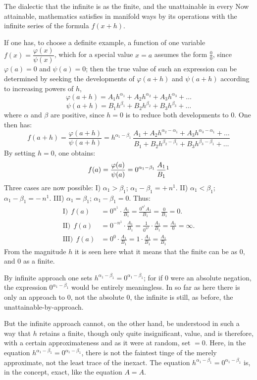 \documentclass[12pt]{book}
\begin{document}
The dialectic that the infinite is as the finite, and the unattainable in every Now
attainable, mathematics satisfies in manifold ways by its operations with the
infinite series of the formula $f(x+h)$.

If one has, to choose a definite example, a function of one variable
$f(x) = \dfrac{\varphi(x)}{\psi(x)}$, which for a special value $x = a$ assumes the
form $\frac{0}{0}$, since $\varphi(a) = 0$ and $\psi(a) = 0$; then the true value of
such an expression can be determined by seeking the developments of $\varphi(a+h)$
and $\psi(a+h)$ according to increasing powers of $h$,
\[
\varphi(a+h) = A_1 h^{\alpha_1} + A_2 h^{\alpha_2} + A_3 h^{\alpha_3} + \dots
\]
\[
\psi(a+h) = B_1 h^{\beta_1} + B_2 h^{\beta_2} + B_3 h^{\beta_3} + \dots
\]
where $\alpha$ and $\beta$ are positive, since $h = 0$ is to reduce both
developments to $0$. One then has:
\[
f(a+h) = \frac{\varphi(a+h)}{\psi(a+h)} = h^{\alpha_1-\beta_1}\,
\frac{A_1 + A_2 h^{\alpha_2-\alpha_1} + A_3 h^{\alpha_3-\alpha_1} + \dots}
     {B_1 + B_2 h^{\beta_2-\beta_1} + B_3 h^{\beta_3-\beta_1} + \dots}
\]
By setting $h = 0$, one obtains:
\[
f(a) = \frac{\varphi(a)}{\psi(a)} = 0^{\alpha_1-\beta_1}\,\frac{A_1}{B_1}\footnotemark
\]
Three cases are now possible: I) $\alpha_1 > \beta_1$; $\alpha_1 - \beta_1 = +\,n^{1}$.
II) $\alpha_1 < \beta_1$; $\alpha_1 - \beta_1 = -\,n^{1}$. III) $\alpha_1 = \beta_1$;
$\alpha_1 - \beta_1 = 0$. Thus:
\begin{align*}
\text{I)}\ \ f(a) &= 0^{n^{1}}\cdot\frac{A_1}{B_1} = \frac{0^{n^{1}}A_1}{B_1}
   = \frac{0}{B_1} = 0.\\
\text{II)}\ \ f(a) &= 0^{-n^{1}}\cdot\frac{A_1}{B_1}
   = \frac{1}{0^{n^{1}}}\cdot\frac{A_1}{B_1} = \frac{A_1}{0} = \infty.\\
\text{III)}\ \ f(a) &= 0^{0}\cdot\frac{A_1}{B_1} = 1\cdot\frac{A_1}{B_1}
   = \frac{A_1}{B_1}
\end{align*}
From the magnitude $h$ it is seen here what it means that the finite can be as $0$,
and $0$ as a finite.

By infinite approach one sets $h^{\alpha_1-\beta_1} = 0^{\alpha_1-\beta_1}$; for if
$0$ were an absolute negation, the expression $0^{\alpha_1-\beta_1}$ would be
entirely meaningless. In so far as here there is only an approach to $0$, not the
absolute $0$, the infinite is still, as before, the unattainable-by-approach.

But the infinite approach cannot, on the other hand, be understood in such a way that
$h$ retains a finite, though only quite insignificant, value, and is therefore, with
a certain approximateness and as it were at random, set $= 0$. Here, in the equation
$h^{\alpha_1-\beta_1} = 0^{\alpha_1-\beta_1}$, there is not the faintest tinge of the
merely approximate, not the least trace of the inexact. The equation
$h^{\alpha_1-\beta_1} = 0^{\alpha_1-\beta_1}$ is, in the concept, exact, like the
equation $A = A$.
\end{document}
